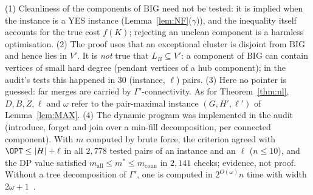 \begin{remark}\label{rem:omegastate}
(1) Cleanliness of the components of $\mathrm{BIG}$ need not be tested: it is implied when the instance is a YES instance (Lemma~\ref{lem:NF}($\gamma$)), and the inequality itself accounts for the true cost $f(K)$; rejecting an unclean component is a harmless optimisation. (2) The proof uses that an exceptional cluster is disjoint from $\mathrm{BIG}$ and hence lies in $V'$. It is \emph{not} true that $L_B\subseteq V'$: a component of $\mathrm{BIG}$ can contain vertices of small hard degree (pendant vertices of a hub component); in the audit's tests this happened in $30$ (instance, $\ell$) pairs. (3) Here no pointer is guessed: far merges are carried by $\Gamma'$-connectivity. As for Theorem~\ref{thm:nl}, $D,B,Z,\ell$ and $\omega$ refer to the pair-maximal instance $(G,H',\ell')$ of Lemma~\ref{lem:MAX}. (4) The dynamic program was implemented in the audit (introduce, forget and join over a min-fill decomposition, per connected component). With $m$ computed by brute force, the criterion agreed with $\OPT\le|H|+\ell$ in all $2{,}778$ tested pairs of an instance and an $\ell$ ($n\le10$), and the DP value satisfied $m_{\mathrm{all}}\le m^*\le m_{\mathrm{conn}}$ in $2{,}141$ checks; evidence, not proof. Without a tree decomposition of $\Gamma'$, one is computed in $2^{O(\omega)}n$ time with width $2\omega+1$~\cite{Kor21}.
\end{remark}

